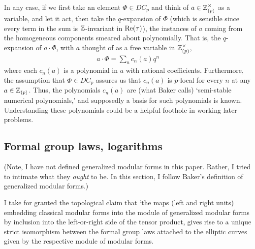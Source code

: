 \documentclass[11pt]{amsart}
\begin{document}
In any case, if we first take an element $\Phi\in DC_{p}$ and think of  $a\in \mathbb{Z}_{(p)}^{\times}$ as a variable, and let it act, then take the $q$-expansion of $\Phi$ (which is sensible since every term in the sum is $\mathbb{Z}$-invariant in $\operatorname{Re}(\tau)$), the instances of $a$ coming from the homogeneous components smeared about polynomially. That is, the $q$-expansion of $a\cdot \Phi$, with $a$ thought of as a free variable in $\mathbb{Z}_{(p)}^{\times}$,
	\begin{align*}
		a\cdot \Phi=\sum_{n}c_{n}(a)q^{n}
	\end{align*} 
where each $c_{n}(a)$ is a polynomial in $a$ with rational coefficients. Furthermore, the assumption that $\Phi\in DC_{p}$ assures us that $c_{n}(a)$ is $p$-local for every $n$ at any $a\in \mathbb{Z}_{(p)}$. Thus, the polynomials $c_{n}(a)$ are (what Baker calls) `semi-stable numerical polynomials,' and supposedly a basis for such polynomials is known. Understanding these polynomials could be a helpful foothole in working later problems.

\subsection{Formal group laws, logarithms}
(Note, I have not defined generalized modular forms in this paper. Rather, I tried to intimate what they \emph{ought} to be. In this section, I follow Baker's definition of generalized modular forms.)

I take for granted the topological claim that `the maps (left and right units) embedding classical modular forms into the module of generalized modular forms by inclusion into the left-or-right side of the tensor product, gives rise to a unique strict isomorphism between the formal group laws attached to the elliptic curves given by the respective module of modular forms.
\end{document}
